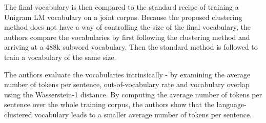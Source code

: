 The final vocabulary is then compared to the standard recipe of training a Unigram LM vocabulary on a joint corpus. Because the proposed clustering method does not have a way of controlling the size of the final vocabulary, the authors compare the vocabularies by first following the clustering method and arriving at a 488k subword vocabulary. Then the standard method is followed to train a vocabulary of the same size.

The authors evaluate the vocabularies intrinsically - by examining the average number of tokens per sentence, out-of-vocabulary rate and vocabulary overlap using the Wasserstein-1 distance.
By computing the average number of tokens per sentence over the whole training corpus, the authors show that the language-clustered vocabulary leads to a smaller average number of tokens per sentence.




